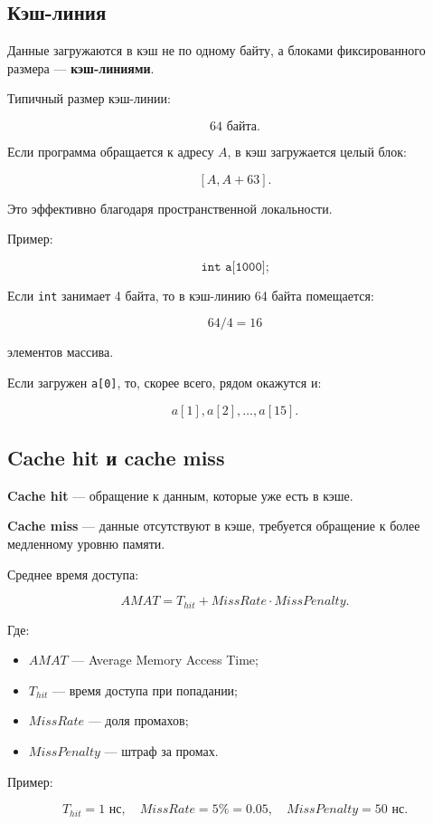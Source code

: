 \documentclass[12pt,a4paper]{article}
\theoremstyle{remark}
\begin{document}
\subsection{Кэш-линия}

Данные загружаются в кэш не по одному байту, а блоками фиксированного размера --- \textbf{кэш-линиями}.

Типичный размер кэш-линии:

\[
64 \text{ байта}.
\]

Если программа обращается к адресу $A$, в кэш загружается целый блок:

\[
[A, A+63].
\]

Это эффективно благодаря пространственной локальности.

Пример:

\[
\texttt{int a[1000];}
\]

Если \texttt{int} занимает 4 байта, то в кэш-линию 64 байта помещается:

\[
64 / 4 = 16
\]

элементов массива.

Если загружен \texttt{a[0]}, то, скорее всего, рядом окажутся и:

\[
a[1], a[2], \ldots, a[15].
\]

\subsection{Cache hit и cache miss}

\textbf{Cache hit} --- обращение к данным, которые уже есть в кэше.

\textbf{Cache miss} --- данные отсутствуют в кэше, требуется обращение к более медленному уровню памяти.

Среднее время доступа:

\[
AMAT = T_{hit} + MissRate \cdot MissPenalty.
\]

Где:
\begin{itemize}
    \item $AMAT$ --- Average Memory Access Time;
    \item $T_{hit}$ --- время доступа при попадании;
    \item $MissRate$ --- доля промахов;
    \item $MissPenalty$ --- штраф за промах.
\end{itemize}

Пример:

\[
T_{hit} = 1 \text{ нс},
\quad
MissRate = 5\% = 0.05,
\quad
MissPenalty = 50 \text{ нс}.
\]
\end{document}
